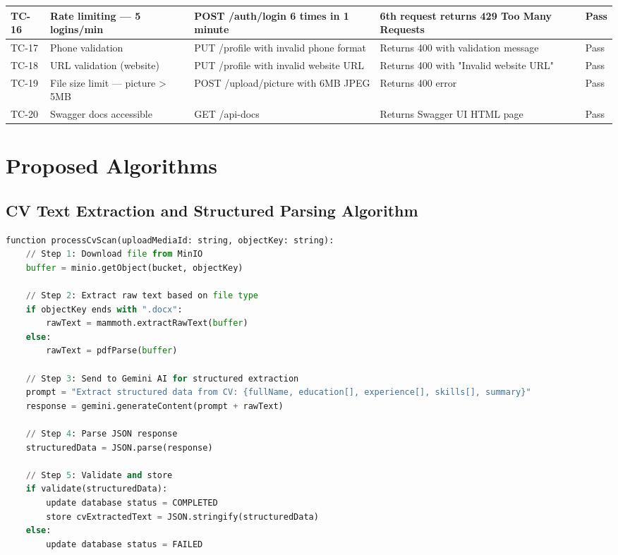 \documentclass[12pt,a4paper]{report}
\begin{document}
\begin{longtable}{|p{0.7cm}|p{3cm}|p{3.5cm}|p{2.5cm}|p{2.5cm}|}
\hline
TC-16 & Rate limiting — 5 logins/min & POST /auth/login 6 times in 1 minute & 6th request returns 429 Too Many Requests & Pass \\
\hline
TC-17 & Phone validation & PUT /profile with invalid phone format & Returns 400 with validation message & Pass \\
\hline
TC-18 & URL validation (website) & PUT /profile with invalid website URL & Returns 400 with "Invalid website URL" & Pass \\
\hline
TC-19 & File size limit — picture > 5MB & POST /upload/picture with 6MB JPEG & Returns 400 error & Pass \\
\hline
TC-20 & Swagger docs accessible & GET /api-docs & Returns Swagger UI HTML page & Pass \\
\hline
\end{longtable}

\section{Proposed Algorithms}

\subsection{CV Text Extraction and Structured Parsing Algorithm}

\begin{lstlisting}[language=Python, caption={CV Scan Pipeline (Pseudocode)}, label={lst:cvscan}]
function processCvScan(uploadMediaId: string, objectKey: string):
    // Step 1: Download file from MinIO
    buffer = minio.getObject(bucket, objectKey)
    
    // Step 2: Extract raw text based on file type
    if objectKey ends with ".docx":
        rawText = mammoth.extractRawText(buffer)
    else:
        rawText = pdfParse(buffer)
    
    // Step 3: Send to Gemini AI for structured extraction
    prompt = "Extract structured data from CV: {fullName, education[], experience[], skills[], summary}"
    response = gemini.generateContent(prompt + rawText)
    
    // Step 4: Parse JSON response
    structuredData = JSON.parse(response)
    
    // Step 5: Validate and store
    if validate(structuredData):
        update database status = COMPLETED
        store cvExtractedText = JSON.stringify(structuredData)
    else:
        update database status = FAILED
\end{lstlisting}
\end{document}
